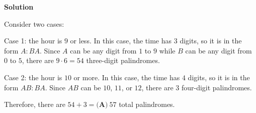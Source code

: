 \begin{enumerate}
\textbf{Solution}

Consider two cases:

 Case 1: the hour is $9$ or less.  In this case, the time has $3$ digits, so it is in the form $A:BA$.  Since $A$ can be any digit from $1$ to $9$ while $B$ can be any digit from $0$ to $5$, there are $9\cdot 6 = 54$ three-digit palindromes.

 Case 2: the hour is $10$ or more.  In this case, the time has $4$ digits, so it is in the form $AB:BA$.  Since $AB$ can be $10$, $11$, or $12$, there are $3$ four-digit palindromes.

 Therefore, there are $54 + 3 = \boxed{\textbf{(A)}\ 57}$ total palindromes.

 


\end{enumerate}